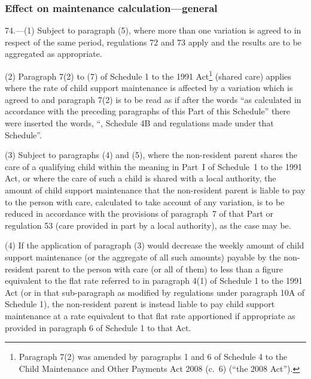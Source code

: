 \documentclass[12pt,a4paper]{article}
\begin{document}
\subsubsection[74. Effect on maintenance calculation---general]{Effect on maintenance calculation---general}

74.---(1)  Subject to paragraph (5), where more than one variation is agreed to in respect of the same period, regulations 72 and 73 apply and the results are to be aggregated as appropriate.


(2) Paragraph 7(2) to (7) of Schedule 1 to the 1991 Act\footnote{Paragraph 7(2) was amended by paragraphs 1 and 6 of Schedule 4 to the Child Maintenance and Other Payments Act 2008 (c.~6) (“the 2008 Act”).} (shared care) applies where the rate of child support maintenance is affected by a variation which is agreed to and paragraph 7(2) is to be read as if after the words “as calculated in accordance with the preceding paragraphs of this Part of this Schedule” there were inserted the words, “, Schedule 4B and regulations made under that Schedule”.

(3) Subject to paragraphs (4) and (5), where the non-resident parent shares the care of a qualifying child within the meaning in Part~I of Schedule~1 to the 1991 Act, or where the care of such a child is shared with a local authority, the amount of child support maintenance that the non-resident parent is liable to pay to the person with care, calculated to take account of any variation, is to be reduced in accordance with the provisions of paragraph~7 of that Part or regulation 53 (care provided in part by a local authority), as the case may be.

(4) If the application of paragraph (3) would decrease the weekly amount of child support maintenance (or the aggregate of all such amounts) payable by the non-resident parent to the person with care (or all of them) to less than a figure equivalent to the flat rate referred to in paragraph 4(1) of Schedule 1 to the 1991 Act (or in that sub-paragraph as modified by regulations under paragraph 10A of Schedule 1), the non-resident parent is instead liable to pay child support maintenance at a rate equivalent to that flat rate apportioned if appropriate as provided in paragraph 6 of Schedule 1 to that Act.
\end{document}
